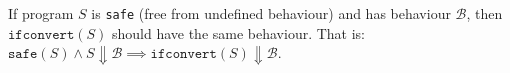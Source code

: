 \begin{theorem}\label{def:forwardsim}
  If program $S$ is \texttt{safe} (free from
  undefined behaviour) and has behaviour
  $\mathcal{B}$, then $\mathtt{ifconvert}(S)$ should have the same behaviour. That is: $\mathtt{safe}(S) \land S \Downarrow \mathcal{B} \implies \mathtt{ifconvert}(S) \Downarrow \mathcal{B}$.



\end{theorem}
